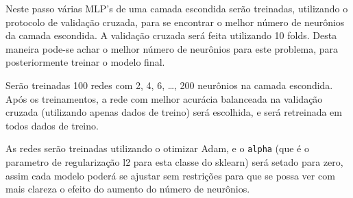 \documentclass[11pt]{article}
\begin{document}
    Neste passo várias MLP's de uma camada escondida serão treinadas,
utilizando o protocolo de validação cruzada, para se encontrar o melhor
número de neurônios da camada escondida. A validação cruzada será feita
utilizando 10 folds. Desta maneira pode-se achar o melhor número de
neurônios para este problema, para posteriormente treinar o modelo
final.

Serão treinadas 100 redes com 2, 4, 6, \ldots, 200 neurônios na camada
escondida. Após os treinamentos, a rede com melhor acurácia balanceada
na validação cruzada (utilizando apenas dados de treino) será escolhida,
e será retreinada em todos dados de treino.

As redes serão treinadas utilizando o otimizar Adam, e o \texttt{alpha}
(que é o parametro de regularização l2 para esta classe do sklearn) será
setado para zero, assim cada modelo poderá se ajustar sem restrições
para que se possa ver com mais clareza o efeito do aumento do número de
neurônios.
\end{document}
